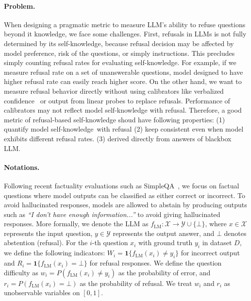 \documentclass{article} %
\theoremstyle{definition}
\begin{document}
\paragraph{Problem.} When designing a pragmatic metric to measure LLM's ability to refuse questions beyond it knowledge, we face some challenges.
First, refusals in LLMs is not fully determined by its self-knowledge, because refusal decision may be affected by model preference, risk of the questions, or simply instructions. 
This precludes simply counting refusal rates for evaluating self-knowledge. 
For example, if we measure refusal rate on a set of unanswerable questions, model designed to have higher refusal rate can easily reach higher score. 
On the other hand, we want to measure refusal behavior directly without using calibrators like verbalized confidence~\citep{xiong2023can} or output from linear probes to replace refusals. 
Performance of calibrators may not reflect model self-knowledge with refusal. 
Therefore, a good metric of refusal-based self-knowledge shoud have following properties: (1) quantify model self-knowledge with refusal (2) keep consistent even when model exhibits different refusal rates. (3) derived directly from answers of blackbox LLM.

\paragraph{Notations.} Following recent factuality evaluations such as SimpleQA~\citep{wei2024measuringshortformfactualitylarge}, we focus on factual questions where model outputs can be classified as either correct or incorrect. 
To avoid hallucinated responses, models are allowed to abstain by producing outputs such as \emph{``I don't have enough information...''} to avoid giving hallucinated responses.
More formally, we denote the LLM as $f_{\text{LM}}: \mathcal{X} \rightarrow \mathcal{Y} \cup \{\bot\}$, where $x \in \mathcal{X}$ represents the input question, $y \in \mathcal{Y}$ represents the output answer, and $\bot$ denotes abstention (refusal). 
For the $i$-th question $x_i$ with ground truth $y_i$ in dataset $D$, we define the following indicators: $W_i = \mathbf{1}\{f_{\text{LM}}(x_i) \neq y_i\}$ for incorrect output and $R_i = \mathbf{1}\{f_{\text{LM}}(x_i) = \bot\}$ for refusal responses. 
We define the question difficulty as $w_i = P(f_{\text{LM}}(x_i) \neq y_i)$ as the probability of error, and $r_i = P(f_{\text{LM}}(x_i) = \bot)$ as the probability of refusal. 
We treat $w_i$ and $r_i$ as unobservable variables on $[0, 1]$. 
\end{document}

